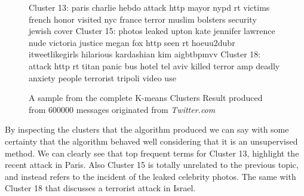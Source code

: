 \documentclass[12pt]{article}
\begin{document}
\begin{figure}[h!]
\begin{footnotesize}
\begin{spverbatim}
Cluster 13:  paris  charlie  hebdo  attack  http  mayor  nypd  
rt  victims  french  honor  visited  nyc  france  terror  muslim 
 bolsters  security  jewish  cover
Cluster 15:  photos  leaked  upton  kate  jennifer  lawrence 
 nude  victoria  justice  megan  fox  http  seen  rt  hoeuu2dubr  
itweetlikegirls  hilarious  kardashian  kim  aigbtbpmvv
Cluster 18: attack http rt titan panic bus hotel tel aviv killed 
terror amp deadly anxiety people terrorist tripoli video use
\end{spverbatim}
\end{footnotesize}
\captionsetup{font=small}
\caption{A sample from the complete K-means Clusters Result produced from  600000 messages originated from \textit{Twitter.com} }
\label{fig:clusters}
\end{figure}
\hfill \break
By inspecting the clusters that the algorithm produced we can say with some certainty that the algorithm behaved well considering that it is an unsupervised method.
We can clearly see that top frequent terms for Cluster 13, highlight the recent attack in Paris\cite{paris-attack}. Also Cluster 15 is totally unrelated to the previous topic, and instead refers to the incident of the leaked celebrity photos\cite{fappening}. The same with Cluster 18 that discusses a terrorist attack in Israel\cite{tel-aviv}.  
\newpage
\end{document}
